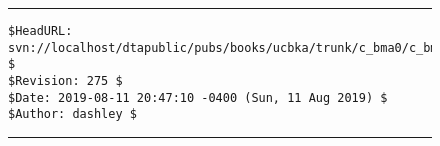 








\noindent\begin{figure}[!b]
\noindent\rule[-0.25in]{\textwidth}{1pt}
\begin{tiny}
\begin{verbatim}
$HeadURL: svn://localhost/dtapublic/pubs/books/ucbka/trunk/c_bma0/c_bma0.tex $
$Revision: 275 $
$Date: 2019-08-11 20:47:10 -0400 (Sun, 11 Aug 2019) $
$Author: dashley $
\end{verbatim}
\end{tiny}
\noindent\rule[0.25in]{\textwidth}{1pt}
\end{figure}

%
